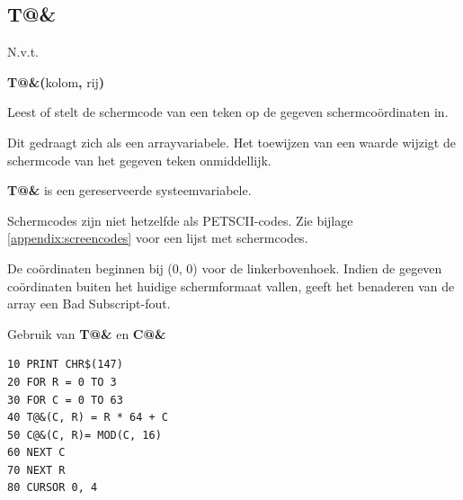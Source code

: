 
\newpage
\subsection{T@\&}
\begin{description}[leftmargin=2cm,style=nextline]
\item [Token:]    N.v.t.

\item [Formaat:]   {\bf T@\&(}kolom{\bf ,} rij{\bf)}

\item [Gebruik:]    Leest of stelt de schermcode van een teken op de gegeven schermcoördinaten in.

                  Dit gedraagt zich als een arrayvariabele. Het toewijzen van een waarde wijzigt de schermcode van het gegeven teken onmiddellijk.

\item[Opmerkingen:]   {\bf T@\&} is een gereserveerde systeemvariabele.

                  Schermcodes zijn niet hetzelfde als PETSCII-codes. Zie bijlage \vref{appendix:screencodes} voor een lijst met schermcodes.

                  De coördinaten beginnen bij (0, 0) voor de linkerbovenhoek. Indien de gegeven coördinaten buiten het huidige schermformaat vallen, geeft het benaderen van de array een Bad Subscript-fout.

\item [Voorbeeld:]  Gebruik van {\bf T@\&} en {\bf C@\&}

\begin{tcolorbox}[colback=black,coltext=white]
\verbatimfont{\codefont}
\begin{verbatim}
10 PRINT CHR$(147)
20 FOR R = 0 TO 3
30 FOR C = 0 TO 63
40 T@&(C, R) = R * 64 + C
50 C@&(C, R)= MOD(C, 16)
60 NEXT C
70 NEXT R
80 CURSOR 0, 4
\end{verbatim}
\end{tcolorbox}
\end{description}


\newpage
